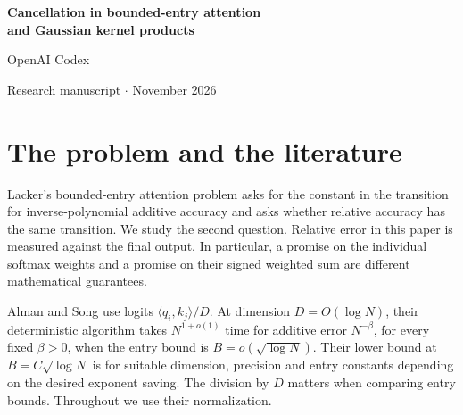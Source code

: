 \documentclass[11pt,letterpaper]{article}
\begin{document}
\thispagestyle{first}
\begin{center}
{\LARGE\bfseries\color{ink} Cancellation in bounded-entry attention\\[4pt] and Gaussian kernel products\par}
\vspace{9pt}
{\large OpenAI Codex}\par
{\small Research manuscript \enspace$\cdot$ November 2026}
\end{center}
\begin{abstract}\noindent
How small must the entries of a softmax attention instance be for fast relative approximation of its output? With signed values, every fixed positive entry bound already admits a reduction from logarithmic-dimensional Orthogonal Vectors. The reduction uses dyadic inputs of logarithmic bit length and works for every fixed relative error below one, even with two possible value entries. It also works for inverse-polynomial entry bounds and for a global Euclidean relative guarantee with every true output strictly positive. The construction groups the coefficients of a bivariate polynomial into keys. Nonorthogonal pairs then cancel exactly inside the attention numerator. At unit entry bound, a Taylor algorithm takes almost-linear time when the logarithm of the cancellation ratio is little-oh of $\log N\log\log N$. Hard instances under the Orthogonal Vectors hypothesis occur at that order. A symmetric embedding of the same polynomial yields a conditional lower bound for signed products with an ordinary Gaussian Gram matrix, addressing Question 5.2 of Shah, Silwal and Xu.
\end{abstract}
\section{The problem and the literature}
Lacker's bounded-entry attention problem \cite{lacker} asks for the constant in the transition for inverse-polynomial additive accuracy and asks whether relative accuracy has the same transition. We study the second question. Relative error in this paper is measured against the final output. In particular, a promise on the individual softmax weights and a promise on their signed weighted sum are different mathematical guarantees.

Alman and Song \cite[Theorems 1.3 and 1.4]{as} use logits $\langle q_i,k_j\rangle/D$. At dimension $D=O(\log N)$, their deterministic algorithm takes $N^{1+o(1)}$ time for additive error $N^{-\beta}$, for every fixed $\beta>0$, when the entry bound is $B=o(\sqrt{\log N})$. Their lower bound at $B=C\sqrt{\log N}$ is for suitable dimension, precision and entry constants depending on the desired exponent saving. The division by $D$ matters when comparing entry bounds. Throughout we use their normalization.
\end{document}
